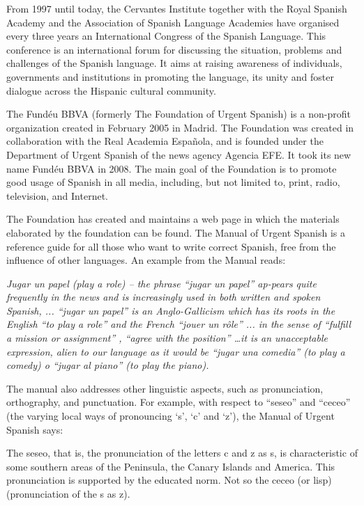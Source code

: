 \begin{multicols}{2}
From 1997 until today, the Cervantes Institute together with the Royal Spanish Academy and the Association of Spanish Language Academies have organised every three years an International Congress of the Spanish Language. This conference is an international forum for discussing the situation, problems and challenges of the Spanish language. It aims at raising awareness of individuals, governments and institutions in promoting the language, its unity and foster dialogue across the Hispanic cultural community.


The Fundéu BBVA (formerly The Foundation of Urgent Spanish) \cite{fundeu} is a non-profit organization created in February 2005 in Madrid. The Foundation was created in collaboration with the Real Academia Española, and is founded under the Department of Urgent Spanish of the news agency Agencia EFE. It took its new name Fundéu BBVA in 2008. The main goal of the Foundation is to promote good usage of Spanish in all media, including, but not limited to, print, radio, television, and Internet.

The Foundation has created and maintains a web page in which the materials elaborated by the foundation can be found. The Manual of Urgent Spanish is a reference guide for all those who want to write correct Spanish, free from the influence of other languages. An example from the Manual reads:

\textit{Jugar un papel (play a role) – the phrase “jugar un papel” ap-pears quite frequently in the news and is increasingly used in both written and spoken Spanish,  ... “jugar un papel” is an Anglo-Gallicism which has its roots in the English "`to play a role"' and the French "`jouer un rôle"' ... in the sense of "`fulfill a mission or assignment"' , "`agree with the position"' \ldots it is an unacceptable expression, alien to our language as it would be “jugar una comedia” (to play a comedy) o “jugar al piano” (to play the piano).}

The manual also addresses other linguistic aspects, such as pronunciation, orthography, and punctuation. For example, with respect to “seseo” and “ceceo” (the varying local ways of pronouncing ‘s’, ‘c’ and ‘z’), the Manual of Urgent Spanish says:

The seseo, that is, the pronunciation of the letters c and z as s, is characteristic of some southern areas of the Peninsula, the Canary Islands and America. This pronunciation is supported by the educated norm. Not so the ceceo (or lisp) (pronunciation of the s as z).


\end{multicols}
